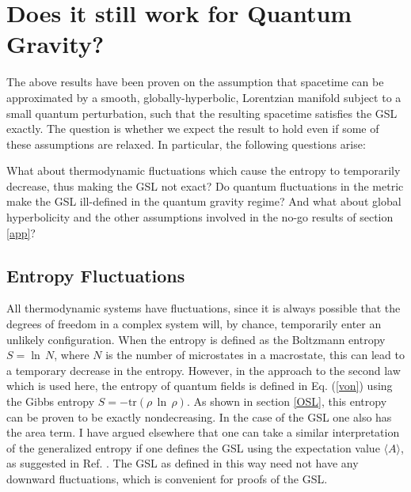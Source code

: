 \documentclass[12pt]{article}
\begin{document}
\section{Does it still work for Quantum Gravity?}\label{QG}

The above results have been proven on the assumption that spacetime can be approximated by a smooth, globally-hyperbolic, Lorentzian manifold subject to a small quantum perturbation, such that the resulting spacetime satisfies the GSL exactly.  The question is whether we expect the result to hold even if some of these assumptions are relaxed.  In particular, the following questions arise:

What about thermodynamic fluctuations which cause the entropy to temporarily decrease, thus making the GSL not exact?  Do quantum fluctuations in the metric make the GSL ill-defined in the quantum gravity regime?  And what about global hyperbolicity and the other assumptions involved in the no-go results of section \ref{app}?

\subsection{Entropy Fluctuations}\label{entfluc}

All thermodynamic systems have fluctuations, since it is always possible that the degrees of freedom in a complex system will, by chance, temporarily enter an unlikely configuration.  When the entropy is defined as the Boltzmann entropy $S = \ln\,N$, where $N$ is the number of microstates in a macrostate, this can lead to a temporary decrease in the entropy.  However, in the approach to the second law which is used here, the entropy of quantum fields is defined in Eq. (\ref{von}) using the Gibbs entropy $S = -\mathrm{tr}(\rho\,\ln\,\rho)$.  As shown in section \ref{OSL}, this entropy can be proven to be exactly nondecreasing.  In the case of the GSL one also has the area term.  I have argued elsewhere \cite{10proofs} that one can take a similar interpretation of the generalized entropy if one defines the GSL using the expectation value $\langle A \rangle$, as suggested in Ref. \cite{fluct}.  The GSL as defined in this way need not have any downward fluctuations, which is convenient for proofs of the GSL.
\end{document}
